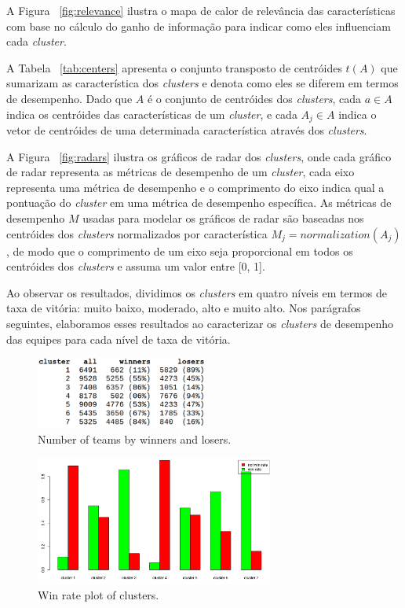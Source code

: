 A Figura ~\ref{fig:relevance} ilustra o mapa de calor de relevância das características com base no cálculo do ganho de informação para indicar como eles influenciam cada \textit{cluster}.

A Tabela ~\ref{tab:centers} apresenta o conjunto transposto de centróides $t(A)$ que sumarizam as característica dos \textit{clusters} e denota como eles se diferem em termos de desempenho. Dado que $A$ é o conjunto de centróides dos \textit{clusters}, cada $a \in A$ indica os centróides das características de um \textit{cluster}, e cada $A_j \in A$ indica o vetor de centróides de uma determinada característica através dos \textit{clusters}.

A Figura ~\ref{fig:radars} ilustra os gráficos de radar dos \textit{clusters}, onde cada gráfico de radar representa as métricas de desempenho de um \textit{cluster}, cada eixo representa uma métrica de desempenho e o comprimento do eixo indica qual a pontuação do \textit{cluster} em uma métrica de desempenho específica. As métricas de desempenho $M$ usadas para modelar os gráficos de radar são baseadas nos centróides dos \textit{clusters} normalizados por característica $M_j = normalization(A_j)$, de modo que o comprimento de um eixo seja proporcional em todos os centróides dos \textit{clusters} e assuma um valor entre [0, 1].

Ao observar os resultados, dividimos os \textit{clusters} em quatro níveis em termos de taxa de vitória: muito baixo, moderado, alto e muito alto. Nos parágrafos seguintes, elaboramos esses resultados ao caracterizar os \textit{clusters} de desempenho das equipes para cada nível de taxa de vitória.

\begin{figure}
  \centering
  \includegraphics[width=0.5\textwidth]{win-rate-table}%
  \caption{Number of teams by winners and losers.}
  \label{fig:win-table}
\end{figure}

\begin{figure}
  \centering
  \includegraphics[width=0.7\textwidth]{win-rate-plot}%
  \caption{Win rate plot of clusters.}
  \label{fig:win-plot}
\end{figure}

